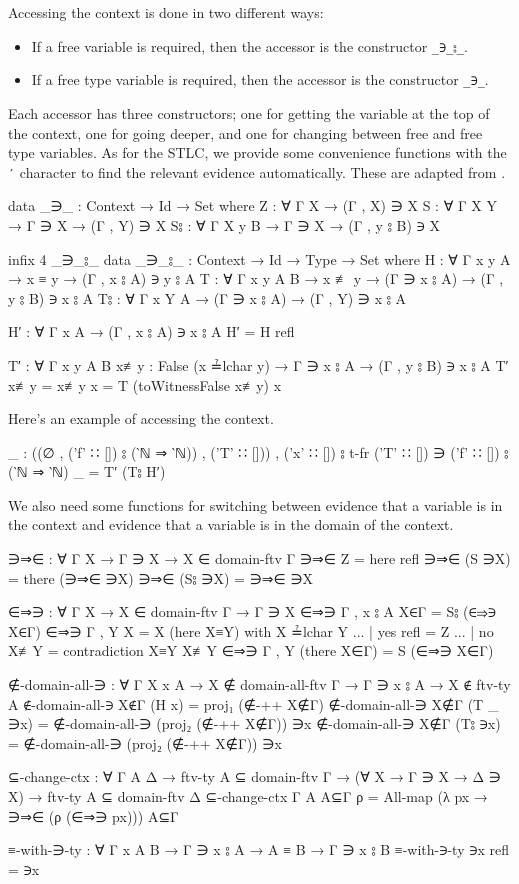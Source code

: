 \documentclass[logo,bsc,singlespacing,parskip,online]{infthesis}
\begin{document}
Accessing the context is done in two different ways:
\begin{itemize}
  \item If a free variable is required, then the accessor is the constructor \texttt{\_∋\_⦂\_}.
  \item If a free type variable is required, then the accessor is the constructor \texttt{\_∋\_}.
\end{itemize}

Each accessor has three constructors; one for getting the variable at the top of the context, one
for going deeper, and one for changing between free and free type variables. As for the STLC, we
provide some convenience functions with the \texttt{′} character to find the relevant evidence
automatically. These are adapted from \citet[chapter~Lambda]{wadler_programming_2022}.
\begin{code}
  data _∋_ : Context → Id → Set where
    Z : ∀ {Γ X} → (Γ , X) ∋ X
    S : ∀ {Γ X Y} → Γ ∋ X → (Γ , Y) ∋ X
    S⦂ : ∀ {Γ X y B} → Γ ∋ X → (Γ , y ⦂ B) ∋ X

  infix 4 _∋_⦂_
  data _∋_⦂_ : Context → Id → Type → Set where
    H : ∀ {Γ x y A} → x ≡ y → (Γ , x ⦂ A) ∋ y ⦂ A
    T : ∀ {Γ x y A B}
      → x ≢ y → (Γ ∋ x ⦂ A) → (Γ , y ⦂ B) ∋ x ⦂ A
    T⦂ : ∀ {Γ x Y A} → (Γ ∋ x ⦂ A) → (Γ , Y) ∋ x ⦂ A

  H′ : ∀ {Γ x A} → (Γ , x ⦂ A) ∋ x ⦂ A
  H′ = H refl

  T′ : ∀ {Γ x y A B} {x≢y : False (x ≟lchar y)}
    → Γ ∋ x ⦂ A → (Γ , y ⦂ B) ∋ x ⦂ A
  T′ { x≢y = x≢y } x = T (toWitnessFalse x≢y) x
\end{code}

Here's an example of accessing the context.
\begin{code}
  _ : ((∅ , ('f' ∷ []) ⦂ (‵ℕ ⇒ ‵ℕ)) , ('T' ∷ []))
        , ('x' ∷ []) ⦂ t-fr ('T' ∷ [])
    ∋ ('f' ∷ []) ⦂ (‵ℕ ⇒ ‵ℕ)
  _ = T′ (T⦂ H′)
\end{code}

We also need some functions for switching between evidence that a variable is in the context and
evidence that a variable is in the domain of the context.
\begin{code}
  ∋⇒∈ : ∀ {Γ X} → Γ ∋ X → X ∈ domain-ftv Γ
  ∋⇒∈ Z = here refl
  ∋⇒∈ (S ∋X) = there (∋⇒∈ ∋X)
  ∋⇒∈ (S⦂ ∋X) = ∋⇒∈ ∋X

  ∈⇒∋ : ∀ {Γ X} → X ∈ domain-ftv Γ → Γ ∋ X
  ∈⇒∋ {Γ , x ⦂ A} X∈Γ = S⦂ (∈⇒∋ X∈Γ)
  ∈⇒∋ {Γ , Y} {X = X} (here X≡Y) with X ≟lchar Y
  ... | yes refl = Z
  ... | no  X≢Y  = contradiction X≡Y X≢Y
  ∈⇒∋ {Γ , Y} (there X∈Γ) = S (∈⇒∋ X∈Γ)

  ∉-domain-all-∋ : ∀ {Γ X x A} → X ∉ domain-all-ftv Γ → Γ ∋ x ⦂ A
    → X ∉ ftv-ty A
  ∉-domain-all-∋ X∉Γ (H x) = proj₁ (∉-++ X∉Γ)
  ∉-domain-all-∋ X∉Γ (T _ ∋x) =
    ∉-domain-all-∋ (proj₂ (∉-++ X∉Γ)) ∋x
  ∉-domain-all-∋ X∉Γ (T⦂ ∋x) =
    ∉-domain-all-∋ (proj₂ (∉-++ X∉Γ)) ∋x

  ⊆-change-ctx : ∀ {Γ A Δ} → ftv-ty A ⊆ domain-ftv Γ
    → (∀ {X} → Γ ∋ X → Δ ∋ X)
    → ftv-ty A ⊆ domain-ftv Δ
  ⊆-change-ctx {Γ} {A} A⊆Γ ρ =
    All-map (λ px → ∋⇒∈ (ρ (∈⇒∋ px))) A⊆Γ

  ≡-with-∋-ty : ∀ {Γ x A B} → Γ ∋ x ⦂ A → A ≡ B → Γ ∋ x ⦂ B
  ≡-with-∋-ty ∋x refl = ∋x
\end{code}
\end{document}
